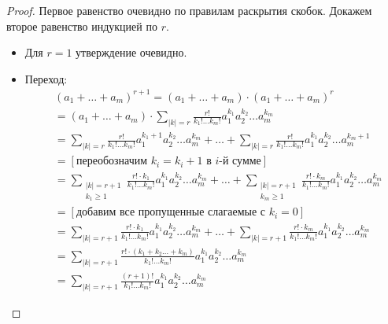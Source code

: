 \begin{proof}
    Первое равенство очевидно по правилам раскрытия скобок. Докажем второе
    равенство индукцией по $r$.

    \begin{itemize}
        \item Для $r = 1$ утверждение очевидно.
        \item Переход:
\begin{align*}
    &(a_1 + \ldots + a_m)^{r+1} = (a_1 + \ldots + a_m) \cdot (a_1 + \ldots +
    a_m)^r \\
    &= (a_1 + \ldots + a_m) \cdot \sum_{|k| = r}{\frac{r!}{k_1! \ldots k_m!}
    a_1^{k_1} a_2^{k_2} \ldots a_m^{k_m}} \\
    &= \sum_{|k| = r}{\frac{r!}{k_1! \ldots k_m!}
    a_1^{k_1 + 1} a_2^{k_2} \ldots a_m^{k_m}} + \ldots +
    \sum_{|k| = r}{\frac{r!}{k_1! \ldots k_m!}
    a_1^{k_1} a_2^{k_2} \ldots a_m^{k_m + 1}} \\
    &= [\text{переобозначим } k_i = k_i + 1 \text{ в } i \text{-й сумме}] \\
    &= \sum_{\substack{|k| = r + 1 \\ k_1 \geqslant 1}}{\frac{r! \cdot k_1}{k_1!
    \ldots k_m!} a_1^{k_1} a_2^{k_2} \ldots a_m^{k_m}} + \ldots +
    \sum_{\substack{|k| = r + 1 \\ k_m \geqslant 1}}{\frac{r! \cdot k_m}{k_1!
    \ldots k_m!} a_1^{k_1} a_2^{k_2} \ldots a_m^{k_m}} \\
    &= [\text{добавим все пропущенные слагаемые с } k_i = 0]
    \\ &= \sum_{|k| = r + 1}{\frac{r! \cdot k_1}{k_1!
    \ldots k_m!} a_1^{k_1} a_2^{k_2} \ldots a_m^{k_m}} + \ldots +
    \sum_{|k| = r + 1}{\frac{r! \cdot k_m}{k_1!
    \ldots k_m!} a_1^{k_1} a_2^{k_2} \ldots a_m^{k_m}} \\
    &= \sum_{|k| = r + 1}{\frac{r! \cdot (k_1 + k_2 \ldots + k_m)}{k_1!
    \ldots k_m!} a_1^{k_1} a_2^{k_2} \ldots a_m^{k_m}} \\
    &=\sum_{|k| = r + 1}{\frac{(r + 1)!}{k_1!
    \ldots k_m!} a_1^{k_1} a_2^{k_2} \ldots a_m^{k_m}}
\end{align*}
    \end{itemize}
\end{proof}

